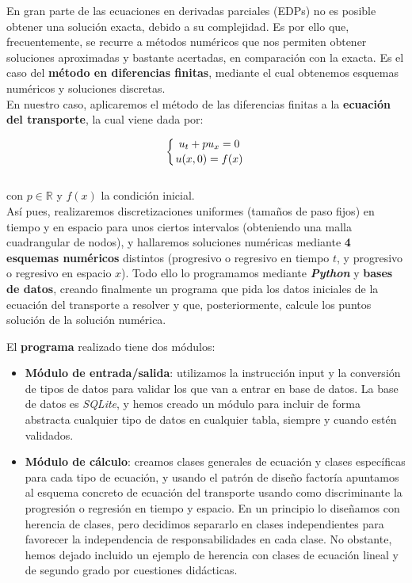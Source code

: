 \documentclass[a4paper,12pt]{article}
\begin{document}
En gran parte de las ecuaciones en derivadas parciales (EDPs) no es posible obtener una solución exacta, debido a su complejidad. Es por ello que, frecuentemente, se recurre a métodos numéricos que nos permiten obtener soluciones aproximadas y bastante acertadas, en comparación con la exacta. Es el caso del \textbf{método en diferencias finitas}, mediante el cual obtenemos esquemas numéricos y soluciones discretas. \\


En nuestro caso, aplicaremos el método de las diferencias finitas a la \textbf{ecuación del transporte}, la cual viene dada por:

$$
\left\{
u_t+p u_x = 0\atop
u(x,0) = f(x)
\right.
$$
\\
con $p \in \mathbb{R}$ y $f(x)$ la condición inicial. \\

Así pues, realizaremos discretizaciones uniformes (tamaños de paso fijos) en tiempo y en espacio para unos ciertos intervalos (obteniendo una malla cuadrangular de nodos), y hallaremos soluciones numéricas mediante \textbf{4 esquemas numéricos} distintos (progresivo o regresivo en tiempo $t$, y progresivo o regresivo en espacio $x$). Todo ello lo programamos mediante \textit{\textbf{Python}} y \textbf{bases de datos}, creando finalmente un programa que pida los datos iniciales de la ecuación del transporte a resolver y que, posteriormente, calcule los puntos solución de la solución numérica. \newpage

El \textbf{programa} realizado tiene dos módulos:
\begin{itemize}
	\item \textbf{Módulo de entrada/salida}: utilizamos la instrucción input y la conversión de tipos de datos para validar los que van a entrar en base de datos. La base de datos es \textit{SQLite}, y hemos creado un módulo para incluir de forma abstracta cualquier tipo de datos en cualquier tabla, siempre y cuando estén validados.
	\item \textbf{Módulo de cálculo}: creamos clases generales de ecuación y clases específicas para cada tipo de ecuación, y usando el patrón de diseño factoría apuntamos al esquema concreto de ecuación del transporte usando como discriminante la progresión o regresión en tiempo y espacio. En un principio lo diseñamos con herencia de clases, pero decidimos separarlo en clases independientes para favorecer la independencia de responsabilidades en cada clase. No obstante, hemos dejado incluido un ejemplo de herencia con clases de ecuación lineal y de segundo grado por cuestiones didácticas.
\end{itemize}
\end{document}

